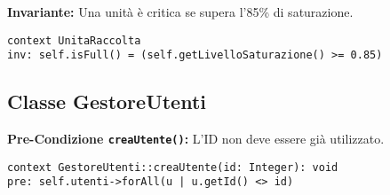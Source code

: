 \textbf{Invariante:} Una unità è critica se supera l’85\% di saturazione.
\begin{lstlisting}[language=OCL]
context UnitaRaccolta
inv: self.isFull() = (self.getLivelloSaturazione() >= 0.85)
\end{lstlisting}

\subsection{Classe GestoreUtenti}

\textbf{Pre-Condizione \texttt{creaUtente()}:} L’ID non deve essere già utilizzato.
\begin{lstlisting}[language=OCL]
context GestoreUtenti::creaUtente(id: Integer): void
pre: self.utenti->forAll(u | u.getId() <> id)
\end{lstlisting}

